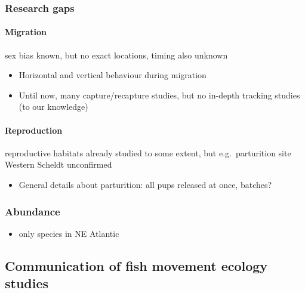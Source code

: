 \documentclass[
  authoryear,
  review,
  3p]{elsarticle}
\let\oldparagraph\paragraph
\renewcommand{\paragraph}[1]{\oldparagraph{#1}\mbox{}}
\providecommand{\tightlist}{%
  \setlength{\itemsep}{0pt}\setlength{\parskip}{0pt}}\usepackage{longtable,booktabs,array}
\begin{document}
\hypertarget{research-gaps}{%
\subsubsection{Research gaps}\label{research-gaps}}

\hypertarget{migration-1}{%
\paragraph{Migration}\label{migration-1}}

sex bias known, but no exact locations, timing also unknown

\begin{itemize}
\tightlist
\item
  Horizontal and vertical behaviour during migration
\item
  Until now, many capture/recapture studies, but no in-depth tracking
  studies (to our knowledge)
\end{itemize}

\hypertarget{reproduction-1}{%
\paragraph{Reproduction}\label{reproduction-1}}

reproductive habitats already studied to some extent, but
e.g.~parturition site Western Scheldt unconfirmed

\begin{itemize}
\tightlist
\item
  General details about parturition: all pups released at once, batches?
\end{itemize}

\hypertarget{abundance}{%
\subsubsection{Abundance}\label{abundance}}

\begin{itemize}
\tightlist
\item
  only species in NE Atlantic
\end{itemize}

\hypertarget{communication-of-fish-movement-ecology-studies}{%
\subsection{Communication of fish movement ecology
studies}\label{communication-of-fish-movement-ecology-studies}}
\end{document}
